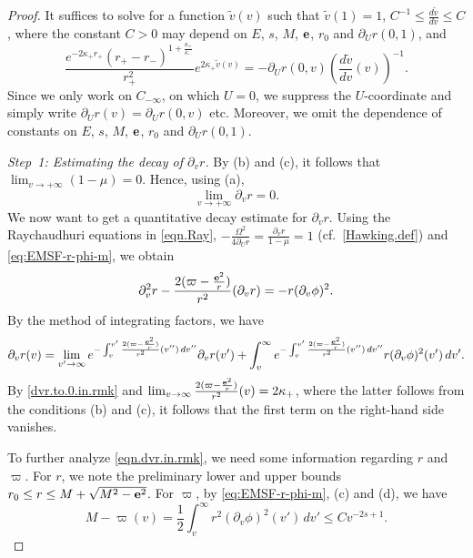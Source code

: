 \documentclass[10pt, reqno]{amsart}
\theoremstyle{definition}
\theoremstyle{remark}
\numberwithin{equation}{section}
\newcommand{\ud}{d}
\newcommand{\rd}{\partial}
\newcommand{\0}{\emptyset}
\newcommand{\kpp}{\kappa}
\newcommand{\Omg}{\Omega}
\newcommand{\bfe}{{\bf e}}
\newcommand{\f}{\frac}
\newcommand{\pfstep}[1]{\vspace{.5em} {\it \noindent #1.}}
\newcommand{\e}{\bfe}							%
\begin{document}
\begin{proof}
It suffices to solve for a function $\widetilde{v}(v)$ such that $\widetilde{v}(1) = 1$, $C^{-1} \leq \f{\ud \widetilde{v}}{\ud v} \leq C$, where the constant $C > 0$ may depend on $E$, $s$, $M$, $\e$, $r_{0}$ and $\rd_{U} r(0, 1)$, and
\begin{equation}\label{condition.for.vtilde}
\f{e^{-2\kappa_+ r_+}(r_+-r_-)^{1+\f{\kappa_+}{\kappa_-}}}{r_+^2} e^{2\kappa_+ \widetilde{v}(v)} = - \rd_{U} r(0, v) \left(\f{\ud \widetilde{v}}{\ud v} (v)\right)^{-1}.
\end{equation}
Since we only work on $C_{-\infty}$, on which $U = 0$, we suppress the $U$-coordinate and simply write $\rd_{U} r (v) = \rd_{U} r(0, v)$ etc. Moreover, we omit the dependence of constants on $E$, $s$, $M$, $\e$, $r_{0}$ and $\rd_{U} r(0, 1)$.

\pfstep{Step~1: Estimating the decay of $\rd_v r$} 
By (b) and (c), it follows that $\lim_{v\to +\infty} (1-\mu) = 0$. Hence, using (a), 
\begin{equation}\label{dvr.to.0.in.rmk}
\lim_{v\to+\infty} \rd_v r = 0.
\end{equation}
We now want to get a quantitative decay estimate for $\rd_v r$. Using the Raychaudhuri equations in \eqref{eqn.Ray}, $-\f{\Omg^2}{4\rd_{U} r} = \f{\rd_{v} r}{1-\mu} = 1$ (cf.~\eqref{Hawking.def}) and \eqref{eq:EMSF-r-phi-m}, we obtain
\begin{equation} \label{ode.dvr.in.rmk}
\rd^2_v r - \f{2(\varpi-\f{{\bf e}^2}{r})}{r^2} (\rd_v r) = -r(\rd_v\phi)^2.
\end{equation}
By the method of integrating factors, we have
\begin{equation} \label{eqn.dvr.in.rmk}
	\rd_{v} r(v) = \lim_{v' \to \infty} e^{-\int_{v}^{v'} \f{2(\varpi-\f{{\bf e}^2}{r})}{r^2} (v'') \, \ud v''} \rd_{v} r(v')
	+ \int_{v}^{\infty} e^{-\int_{v}^{v'} \f{2(\varpi-\f{{\bf e}^2}{r})}{r^2} (v'') \, \ud v''} r (\rd_{v} \phi)^{2}(v') \, \ud v'.
\end{equation}
By \eqref{dvr.to.0.in.rmk} and $\lim_{v \to \infty} \f{2(\varpi-\f{{\bf e}^2}{r})}{r^2} (v) = 2 \kpp_{+}$, where the latter follows from the conditions (b) and (c), it follows that the first term on the right-hand side vanishes. 

To further analyze \eqref{eqn.dvr.in.rmk}, we need some information regarding $r$ and $\varpi$. For $r$, we note the preliminary lower and upper bounds $r_{0} \leq r \leq M + \sqrt{M^{2} - \e^{2}}$. For $\varpi$, by \eqref{eq:EMSF-r-phi-m}, (c) and (d), we have
\begin{equation} \label{m.converge.in.rmk}
	M - \varpi(v) = \frac{1}{2} \int_{v}^{\infty} r^{2} (\rd_{v} \phi)^{2}(v') \, \ud v' \leq C v^{-2s + 1}.
\end{equation}


\end{proof}
\end{document}
